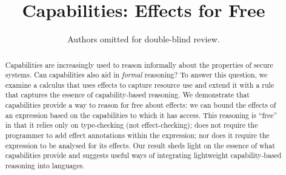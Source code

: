 \documentclass[a4paper,UKenglish]{lipics-v2016}
\title{Capabilities: Effects for Free}
\author{Authors omitted for double-blind review.}
\begin{document}
\maketitle

\begin{abstract}
Capabilities are increasingly used to reason informally about the properties of secure systems. Can capabilities also aid in \textit{formal} reasoning? To answer this question, we examine a calculus that uses effects to capture resource use and extend it with a rule that captures the essence of capability-based reasoning. We demonstrate that capabilities provide a way to reason for free about effects: we can bound the effects of an expression based on the capabilities to which it has access.  This reasoning is ``free'' in that it relies only on type-checking (not effect-checking); does not require the programmer to add effect annotations within the expression; nor does it require the expression to be analysed for its effects. Our result sheds light on the essence of what capabilities provide and suggests useful ways of integrating lightweight capability-based reasoning into languages.
\end{abstract}











\appendix
% 
\end{document}
